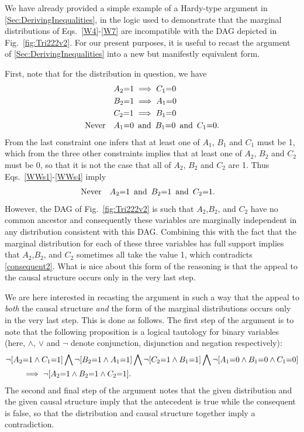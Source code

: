 We have already provided a simple example of a Hardy-type argument in \cref{Sec:DerivingInequalities}, in the logic used to demonstrate that the marginal distributions of Eqs.~\eqref{W4}-\eqref{W7} are incompatible with the DAG depicted in Fig.~\ref{fig:Tri222v2}.   For our present purposes, it is useful to recast the argument of \cref{Sec:DerivingInequalities} into a new but manifestly equivalent form.    

First, note that for the distribution in question, we have
\begin{align} 
&A_2 \mathord{=} 1 \implies C_1\mathord{=} 0\label{WWs1}\\
&B_2\mathord{=} 1 \implies A_1\mathord{=} 0\label{WWs2}\\
&C_2 \mathord{=} 1 \implies B_1 \mathord{=} 0\label{WWs3}\\
\text{Never}  \quad &A_1 \mathord{=} 0\,\text{ and }\, B_1 \mathord{=} 0\,\text{ and }\, C_1 \mathord{=} 0.\label{WWs4}
\end{align}
From the last constraint one infers that at least one of $A_1$, $B_1$ and $C_1$ must be 1, which from the three other constraints implies that at least one of $A_2$, $B_2$ and $C_2$ must be 0, so that it is not the case that all of $A_2$, $B_2$ and $C_2$ are 1.  Thus Eqs.~\eqref{WWs1}-\eqref{WWs4} imply
\begin{align} \label{consequent2}
\text{Never}  \quad &A_2 \mathord{=} 1\,\text{ and }\, B_2 \mathord{=} 1\,\text{ and }\, C_2 \mathord{=} 1.
\end{align}
However, the DAG of Fig.~\ref{fig:Tri222v2} is such that $A_2$,$B_2$, and $C_2$ have no common ancestor and consequently these variables are marginally independent in any distribution consistent with this DAG.  Combining this with the fact that the marginal distribution for each of these three variables has full support implies that $A_2$,$B_2$, and $C_2$ sometimes all take the value 1, which contradicts \cref{consequent2}.  What is nice about this form of the reasoning is that the appeal to the causal structure occurs only in the very last step.  

We are here interested in recasting the argument in such a way that the appeal to {\em both} the causal structure {\em and} the form of the marginal distributions occurs only in the very last step.  This is done as follows.  The first step of the argument is to note that the following proposition is a logical tautology for binary variables (here, $\land$, $\lor$ and $\lnot$ denote conjunction, disjunction and negation respectively):
\begin{align}\begin{split}\label{tautology1}
&\lnot [A_2 \mathord{=} 1 \land C_1 \mathord{=} 1] \bigwedge \lnot [B_2 \mathord{=} 1 \land A_1 \mathord{=} 1] \bigwedge \lnot [C_2 \mathord{=} 1 \land B_1 \mathord{=} 1] \bigwedge \lnot [A_1 \mathord{=} 0 \land B_1 \mathord{=} 0 \land C_1 \mathord{=} 0]\\
 &\qquad\implies
\lnot [A_2 \mathord{=} 1 \land B_2 \mathord{=} 1 \land C_2 \mathord{=} 1].
\end{split}\end{align}
The second and final step of the argument notes that the given distribution and the given causal structure imply that the antecedent is true while the consequent is false, so that the distribution and causal structure together imply a contradiction.

